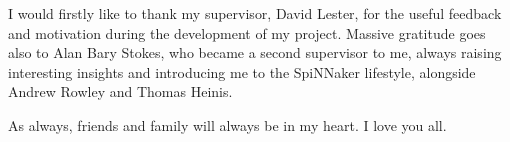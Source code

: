 { \par}
\vspace{5mm}
I would firstly like to thank my supervisor, David Lester, for the useful feedback and motivation during the development of my project. Massive gratitude goes also to Alan Bary Stokes, who became a second supervisor to me, always raising interesting insights and introducing me to the SpiNNaker lifestyle, alongside Andrew Rowley and Thomas Heinis.

As always, friends and family will always be in my heart. I love you all.